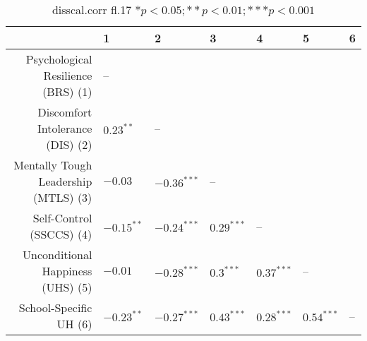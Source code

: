 \begin{table}[ht]
\centering
\begin{tabular}{rllllll}
  \hline
 & 1 & 2 & 3 & 4 & 5 & 6 \\ 
  \hline
Psychological Resilience (BRS) (1) & -- &  &  &  &  &  \\ 
  Discomfort Intolerance (DIS) (2) & $0.23^{**}$ & -- &  &  &  &  \\ 
  Mentally Tough Leadership (MTLS) (3) & $-0.03$ & $-0.36^{***}$ & -- &  &  &  \\ 
  Self-Control (SSCCS) (4) & $-0.15^{**}$ & $-0.24^{***}$ & $0.29^{***}$ & -- &  &  \\ 
  Unconditional Happiness (UHS) (5) & $-0.01$ & $-0.28^{***}$ & $0.3^{***}$ & $0.37^{***}$ & -- &  \\ 
  School-Specific UH (6) & $-0.23^{**}$ & $-0.27^{***}$ & $0.43^{***}$ & $0.28^{***}$ & $0.54^{***}$ & -- \\ 
   \hline
\end{tabular}
\caption{disscal.corr fl.17 $* p < 0.05; ** p < 0.01; *** p < 0.001$} 
\label{freq_corr.disscal.corr.fl.17}
\end{table}
